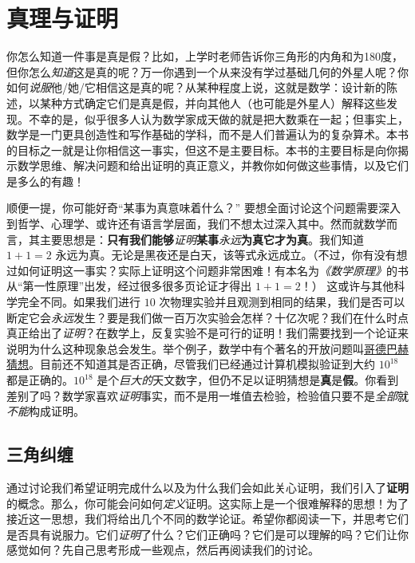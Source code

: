 \section{真理与证明}\label{sec:section1.1}

你怎么知道一件事是真是假？比如，上学时老师告诉你三角形的内角和为180度，但你怎么\textit{知道}这是真的呢？万一你遇到一个从来没有学过基础几何的外星人呢？你如何\textit{说服}他/她/它相信这是真的呢？从某种程度上说，这就是数学：设计新的陈述，以某种方式确定它们是真是假，并向其他人（也可能是外星人）解释这些发现。不幸的是，似乎很多人认为数学家成天做的就是把大数乘在一起；但事实上，数学是一门更具创造性和写作基础的学科，而不是人们普遍认为的复杂算术。本书的目标之一就是让你相信这一事实，但这不是主要目标。本书的主要目标是向你揭示数学思维、解决问题和给出证明的真正意义，并教你如何做这些事情，以及它们是多么的有趣！

顺便一提，你可能好奇“某事为真意味着什么？” 要想全面讨论这个问题需要深入到哲学、心理学、或许还有语言学层面，我们不想太过深入其中。然而就数学而言，其主要思想是：\textbf{只有我们能够}\textit{证明}\textbf{某事}\textit{永远}\textbf{为真它才为真}。我们知道 $1+1=2$ 永远为真。无论是黑夜还是白天，该等式永远成立。（不过，你有没有想过如何证明这一事实？实际上证明这个问题非常困难！有本名为\textit{《数学原理》}的书从“第一性原理”出发，经过很多很多页论证才得出 $1+1=2$！） 这或许与其他科学完全不同。如果我们进行 $10$ 次物理实验并且观测到相同的结果，我们是否可以断定它会\textit{永远}发生？要是我们做一百万次实验会怎样？十亿次呢？我们在什么时点真正给出了\textit{证明}？在数学上，反复实验不是可行的证明！我们需要找到一个论证来说明为什么这种现象总会发生。举个例子，数学中有个著名的开放问题叫\href{https://baike.baidu.com/item/哥德巴赫猜想/72364}{哥德巴赫猜想}。目前还不知道其是否正确，尽管我们已经通过计算机模拟验证到大约 $10^18$ 都是正确的。$10^18$ 是个\textit{巨大的}天文数字，但仍不足以证明猜想是\textbf{真}是\textbf{假}。你看到差别了吗？数学家喜欢\textit{证明}事实，而不是用一堆值去检验，检验值只要不是\textit{全部}就\textit{不能}构成证明。

\subsection{三角纠缠}

通过讨论我们希望证明完成什么以及为什么我们会如此关心证明，我们引入了\textbf{证明}的概念。那么，你可能会问如何\textit{定义}证明。这实际上是一个很难解释的思想！为了接近这一思想，我们将给出几个不同的数学论证。希望你都阅读一下，并思考它们是否具有说服力。它们\textit{证明}了什么？它们正确吗？它们是可以理解的吗？它们让你感觉如何？先自己思考形成一些观点，然后再阅读我们的讨论。

